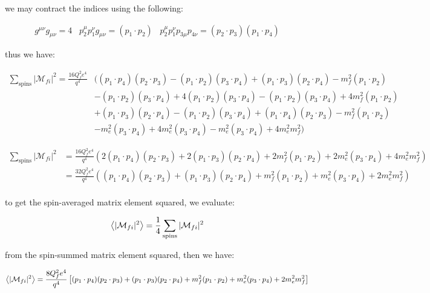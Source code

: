 \documentclass[11pt]{article}
\theoremstyle{definition}
\begin{document}
we may contract the indices using the following:

\begin{align*}
    g^{\mu\nu}g_{\mu\nu} = 4
    \;\;\;
    p_2^{\mu}p_1^{\nu}g_{\mu\nu} = (p_1 \cdot p_2)
    \;\;\;
    p_2^{\mu}p_1^{\nu}p_{3\mu}p_{4\nu} = (p_2 \cdot p_3)(p_1 \cdot p_4)
\end{align*}

thus we have:

\begin{align}
    \sum_{\text{spins}} |\mathcal{M}_{fi}|^2  = \frac{16Q_f^2e^4}{q^4}
    &\biggl(
    (p_1 \cdot p_4) (p_2 \cdot p_3)
    - (p_1 \cdot p_2) (p_3 \cdot p_4)
    + (p_1 \cdot p_3)(p_2 \cdot p_4)
    -m_f^2(p_1 \cdot p_2)\\  
     &- (p_1 \cdot p_2)(p_3 \cdot p_4)
     + 4(p_1 \cdot p_2)(p_3 \cdot p_4)
     - (p_1 \cdot p_2)(p_3 \cdot p_4)
     + 4m_f^2(p_1 \cdot p_2)\\
    &+ (p_1 \cdot p_3) (p_2 \cdot p_4)
    -(p_1 \cdot p_2) (p_3 \cdot p_4)
    +(p_1 \cdot p_4) (p_2 \cdot p_3)
    - m_f^2 (p_1 \cdot p_2)\\
        &- m_e^2(p_3 \cdot p_4) 
        + 4m_e^2(p_3 \cdot p_4)
        - m_e^2(p_3 \cdot p_4)
        + 4m_e^2m_f^2
    \biggr)
\end{align}

\begin{align}
    \sum_{\text{spins}} |\mathcal{M}_{fi}|^2  &= \frac{16Q_f^2e^4}{q^4}
    \left(
        2(p_1 \cdot p_4) (p_2 \cdot p_3)
        + 2(p_1 \cdot p_3) (p_2 \cdot p_4)
        + 2m_f^2(p_1 \cdot p_2)
        + 2m_e^2(p_3 \cdot p_4)
        + 4m_e^2m_f^2  
    \right)\\
    &= \frac{32Q_f^2e^4}{q^4}
    \left(
        (p_1 \cdot p_4) (p_2 \cdot p_3)
        + (p_1 \cdot p_3) (p_2 \cdot p_4)
        + m_f^2(p_1 \cdot p_2)
        + m_e^2(p_3 \cdot p_4)
        + 2m_e^2m_f^2  
    \right)\\
\end{align}

to get the spin-averaged matrix element squared, we evaluate:

\begin{align}
    \expval{|\mathcal{M}_{fi}|^2} &= \frac{1}{4}\sum_{\text{spins}} |\mathcal{M}_{fi}|^2\\  
\end{align}

from the spin-summed matrix element squared, then we have:

\begin{align}
    \expval{|\mathcal{M}_{fi}|^2}
    =
    \frac{8Q_f^2e^4}{q^4}
    \left[
        (p_1 \cdot p_4) (p_2 \cdot p_3)
        + (p_1 \cdot p_3) (p_2 \cdot p_4)
        + m_f^2(p_1 \cdot p_2)
        + m_e^2(p_3 \cdot p_4)
        + 2m_e^2m_f^2  
    \right]
\end{align}
\end{document}
